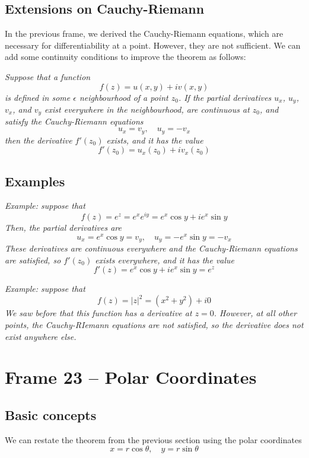 \documentclass{article}
\begin{document}
\subsection{Extensions on Cauchy-Riemann}
In the previous frame, we derived the Cauchy-Riemann equations, which are necessary for differentiability at a point. However, they are not sufficient. We can add some continuity conditions to improve the theorem as follows:

\textit{Suppose that a function
\[
	f(z) = u(x, y) + iv(x, y)
\]
is defined in some $\epsilon$ neighbourhood of a point $z_0$. If the partial derivatives $u_x$, $u_y$, $v_x$, and $v_y$ exist everywhere in the neighbourhood, are continuous at $z_0$, and satisfy the Cauchy-Riemann equations
\[
	u_x = v_y,	\quad	u_y = -v_x
\]	
then the derivative $f'(z_0)$ exists, and it has the value
\[
	f'(z_0) = u_x(z_0) + iv_x(z_0)
\]}

\subsection{Examples}
\textit{Example: suppose that
\[
	f(z) = e^z = e^x e^{iy} = e^x \cos y + ie^x \sin y
\]
Then, the partial derivatives are
\[
	u_x = e^x \cos y = v_y,	\quad	u_y = -e^x \sin y = -v_x
\]
These derivatives are continuous everywhere and the Cauchy-Riemann equations are satisfied, so $f'(z_0)$ exists everywhere, and it has the value
\[
	f'(z) = e^x \cos y + ie^x \sin y = e^z
\]}

\textit{Example: suppose that
\[
	f(z) = |z|^2 = (x^2 + y^2) + i0
\]
We saw before that this function has a derivative at $z = 0$. However, at all other points, the Cauchy-RIemann equations are not satisfied, so the derivative does not exist anywhere else.}


\clearpage
\section{Frame 23 -- Polar Coordinates}
\subsection{Basic concepts}
We can restate the theorem from the previous section using the polar coordinates
\[
	x = r \cos \theta,	\quad	y = r \sin \theta
\]
\end{document}
